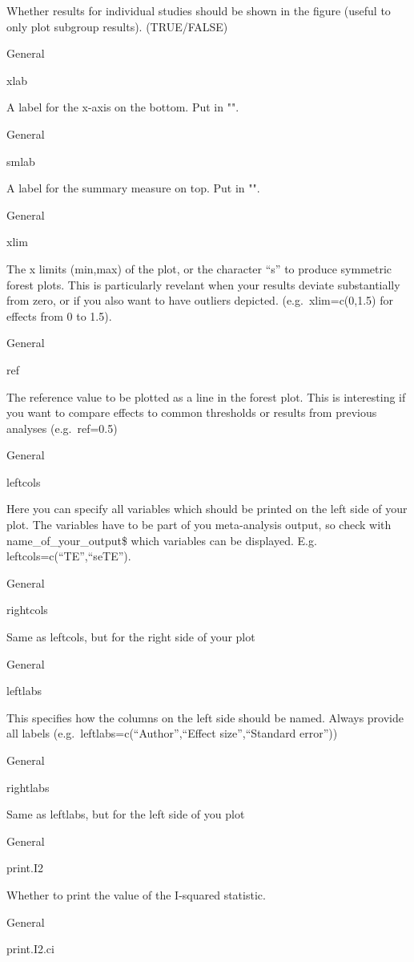 \documentclass[]{book}
\begin{document}
Whether results for individual studies should be shown in the figure (useful to only plot subgroup results). (TRUE/FALSE)

General

xlab

A label for the x-axis on the bottom. Put in "".

General

smlab

A label for the summary measure on top. Put in "".

General

xlim

The x limits (min,max) of the plot, or the character ``s'' to produce symmetric forest plots. This is particularly revelant when your results deviate substantially from zero, or if you also want to have outliers depicted. (e.g.~xlim=c(0,1.5) for effects from 0 to 1.5).

General

ref

The reference value to be plotted as a line in the forest plot. This is interesting if you want to compare effects to common thresholds or results from previous analyses (e.g.~ref=0.5)

General

leftcols

Here you can specify all variables which should be printed on the left side of your plot. The variables have to be part of you meta-analysis output, so check with name\_of\_your\_output\$ which variables can be displayed. E.g. leftcols=c(``TE'',``seTE'').

General

rightcols

Same as leftcols, but for the right side of your plot

General

leftlabs

This specifies how the columns on the left side should be named. Always provide all labels (e.g.~leftlabs=c(``Author'',``Effect size'',``Standard error''))

General

rightlabs

Same as leftlabs, but for the left side of you plot

General

print.I2

Whether to print the value of the I-squared statistic.

General

print.I2.ci
\end{document}
